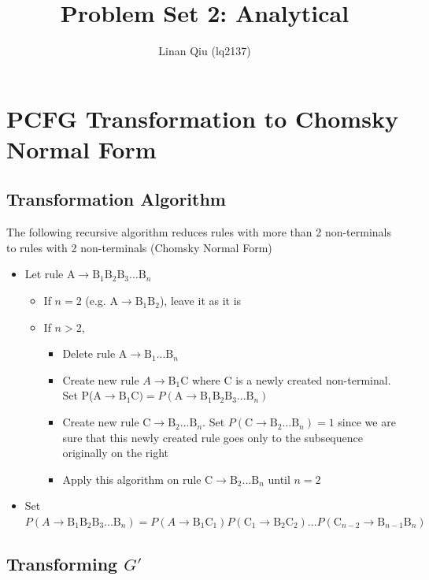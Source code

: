 \documentclass[11pt]{scrartcl}
\title{Problem Set 2: Analytical}
\author{Linan Qiu (lq2137)}
\newcommand{\n}[1]{\ensuremath{\text{#1}}}
\begin{document}
\maketitle

\section{PCFG Transformation to Chomsky Normal Form}

\subsection{Transformation Algorithm}

The following recursive algorithm reduces rules with more than 2 non-terminals to rules with 2 non-terminals (Chomsky Normal Form)

\begin{itemize}
\item Let rule $\n{A} \rightarrow \n{B}_1 \n{B}_2 \n{B}_3 ... \n{B}_n$
\begin{itemize}
\item If $n = 2$ (e.g. $\n{A} \rightarrow \n{B}_1 \n{B}_2$), leave it as it is
\item If $n > 2$,
\begin{itemize}
\item Delete rule $\n{A} \rightarrow \n{B}_1 ... \n{B}_n$
\item Create new rule $A \rightarrow \n{B}_1 \n{C}$ where $\n{C}$ is a newly created non-terminal. Set P($\n{A} \rightarrow \n{B}_1 \n{C}) = P(\n{A} \rightarrow \n{B}_1 \n{B}_2 \n{B}_3 ... \n{B}_n)$
\item Create new rule $\n{C} \rightarrow \n{B}_2 ... \n{B}_n$. Set $P(\n{C} \rightarrow \n{B}_2 ... \n{B}_n) = 1$ since we are sure that this newly created rule goes only to the subsequence originally on the right
\item Apply this algorithm on rule $\n{C} \rightarrow \n{B}_2 ... \n{B}_n$ until $n=2$
\end{itemize}
\end{itemize}
\item Set $P(A \rightarrow \n{B}_1 \n{B}_2 \n{B}_3 ... \n{B}_n) = P(A \rightarrow \n{B}_1 \n{C}_1) P(\n{C}_1 \rightarrow \n{B}_2 \n{C}_2) ... P(\n{C}_{n-2} \rightarrow \n{B}_{n-1} \n{B}_n)$
\end{itemize}

\subsection{Transforming $G'$}
\end{document}

